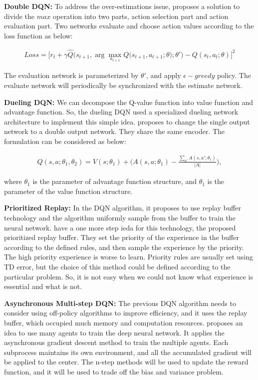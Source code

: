 \documentclass{article}
\begin{document}
{\bf Double DQN:}
To address the over-estimations  issue, \citep{van2016deep} proposes a solution to divide the $max$ operation into two parts, action selection part and action evaluation part.  Two networks evaluate and choose action values according to the loss function as below:

\begin{align}
Loss=\Big[ r_{t} + \gamma \hat {Q} \Big(s_{t+1}, \arg \underset{a_{t+1}}{\max} {Q} \big(s_{t+1}, a_{t+1};{\theta} \big); {\theta}' \Big) - {Q}(s_t,a_t;{\theta}) \Big]^2
\end{align}


The evaluation network is parameterized by ${\theta}'$, and apply $\epsilon-greedy$ policy. The evaluate network will periodically be synchronized with the estimate network.

{\bf Dueling DQN:}
We can decompose the Q-value function into value function and advantage function. So, the dueling DQN used a specialized dueling network architecture to implement this simple idea. \citep{wang2015dueling} proposes to change the single output network to a double output network. They share the same encoder. The formulation can be considered as below:

\begin{align}
{Q} (s,a;{\theta_{1}},{\theta_{2}}) =  {V}(s;{\theta_{1}}) + \Big({A} (s,a;{\theta_{1}}) - \frac{\sum_{a'} {A} (s,a';{\theta_{1}})}{|{A}|}		\Big) ,
\end{align}

where $\theta_1$ is the parameter of advantage function structure, and $\theta_1$ is the parameter of the value function structure. 


{\bf Prioritized Replay:}
In the DQN algorithm, it proposes to use replay buffer technology and the algorithm uniformly sample from the buffer to train the neural network. \citep{schaul2015prioritized} have a one more step ieda for this technology, the proposed prioritized replay buffer. They set the priority of the experience in the buffer according to the defined rules, and then sample the experience by the priority. The high priority experience is worse to learn. Priority rules are usually set using TD error, but the choice of this method could be defined according to the particular problem. So, it is not easy when we could not know what experience is essential and what is not.

{\bf Asynchronous Multi-step DQN:}
The previous DQN algorithm needs to consider using off-policy algorithms to improve efficiency, and it uses the replay buffer, which occupied much memory and computation resources. \citep{mnih2016asynchronous} proposes an idea to use many agents to train the deep neural network. It applies the asynchronous gradient descent method to train the multiple agents. Each subprocess maintains its own environment, and all the accumulated gradient will be applied to the center.
The n-step methods \citep{sutton2018reinforcement} will be used to update the reward function, and it will be used to trade off the bias and variance problem.
\end{document}
